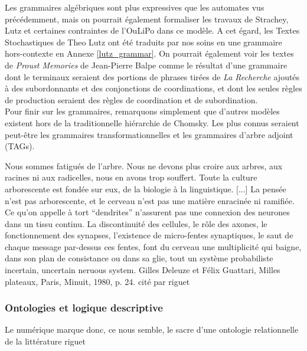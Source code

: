 \documentclass{article}
\begin{document}
				Les grammaires algébriques sont plus expressives que les automates vus précédemment, mais on pourrait également formaliser les travaux de Strachey, Lutz et certaines contraintes de l'OuLiPo dans ce modèle. A cet égard, les Textes Stochastiques de Theo Lutz ont été traduits par nos soins en une grammaire hors-contexte en Annexe \ref{lutz_grammar}. On pourrait également voir les textes de \textit{Proust Memories} de Jean-Pierre Balpe comme le résultat d'une grammaire dont le terminaux seraient des portions de phrases tirées de \textit{La Recherche} ajoutés à des subordonnants et des conjonctions de coordinations, et dont les seules règles de production seraient des règles de coordination et de subordination.\\
				Pour finir sur les grammaires, remarquons simplement que d'autres modèles existent hors de la traditionnelle hiérarchie de Chomsky. Les plus connus seraient peut-être les grammaires transformationnelles \cite{chomsky1979} et les grammaires d'arbre adjoint (TAGs)\cite{joshi1997}.
				
				
				Nous sommes fatigués de l'arbre. Nous ne devons plus croire aux arbres, aux racines
				ni aux radicelles, nous en avons trop souffert. Toute la culture arborescente est
				fondée sur eux, de la biologie à la linguistique. [...] La pensée n'est pas arborescente,
				et le cerveau n'est pas une matière enracinée ni ramifiée. Ce qu'on appelle à tort  ``dendrites'' n'assurent pas une connexion des neurones dans un tissu continu. La
				discontinuité des cellules, le rôle des axones, le fonctionnement des synapses,
				l'existence de micro-fentes synaptiques, le saut de chaque message par-dessus ces
				fentes, font du cerveau une multiplicité qui baigne, dans son plan de consistance ou
				dans sa glie, tout un système probabiliste incertain, uncertain neruous system. Gilles Deleuze et Félix Guattari, Milles plateaux, Paris, Minuit, 1980, p. 24. cité par riguet
			\subsubsection{Ontologies et logique descriptive}
			Le numérique marque donc, ce nous semble, le sacre d’une ontologie relationnelle de la
			littérature riguet
\end{document}
